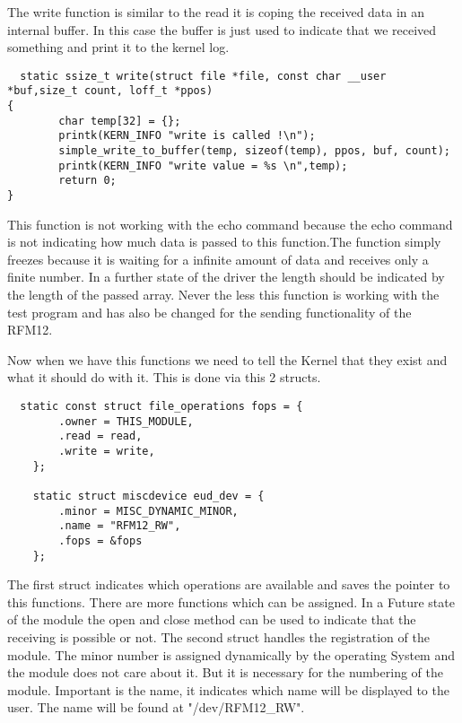 The write function is similar to the read it is coping the received data in an internal buffer. In this case the buffer is just used to indicate that we received something and print it to the kernel log. 

\begin{lstlisting}
  static ssize_t write(struct file *file, const char __user *buf,size_t count, loff_t *ppos)
{
		char temp[32] = {};
		printk(KERN_INFO "write is called !\n");
		simple_write_to_buffer(temp, sizeof(temp), ppos, buf, count);
		printk(KERN_INFO "write value = %s \n",temp);
		return 0;
}                                                                                                                        
\end{lstlisting}

This function is not working with the echo command because the echo command is not indicating how much data is passed to this function.The function simply freezes because it is waiting for a infinite amount of data and receives only a finite number. In a further state of the driver the length should be indicated by the length of the passed array. Never the less this function is working with the test program and has also be changed for the sending functionality of the RFM12. \newline

Now when we have this functions we need to tell the Kernel that they exist and what it should do with it. This is done via this 2 structs. 

\begin{lstlisting}
  static const struct file_operations fops = {
		.owner = THIS_MODULE,
		.read = read,
		.write = write,
	};
	
	static struct miscdevice eud_dev = {
		.minor = MISC_DYNAMIC_MINOR,
		.name = "RFM12_RW",
		.fops = &fops
	};                                                                                                                       
\end{lstlisting}

The first struct indicates which operations are available and saves the pointer to this functions. There are more functions which can be assigned. In a Future state of the module the open and close method can be used to indicate that the receiving is possible or not. \newline
The second struct handles the registration of the module. The minor number is assigned dynamically by the operating System and the module does not care about it. But it is necessary for the numbering of the module. Important is the name, it indicates which name will be displayed to the user. The name will be found at "/dev/RFM12\_RW". \newline

